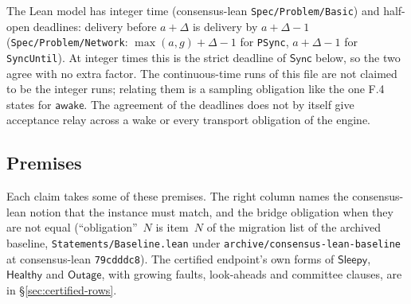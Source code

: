 \documentclass{article}
\begin{document}
The Lean model has integer time (consensus-lean \texttt{Spec/Problem/Basic})
and half-open deadlines: delivery before $a+\Delta$ is delivery by
$a+\Delta-1$ (\texttt{Spec/Problem/Network}: $\max(a,g)+\Delta-1$ for
\texttt{PSync}, $a+\Delta-1$ for \texttt{SyncUntil}).  At integer times this is
the strict deadline of $\mathsf{Sync}$ below, so the two agree with no extra
factor.  The continuous-time runs of this file are not claimed to be the
integer runs; relating them is a sampling obligation like the one F.4 states
for $\mathsf{awake}$.  The agreement of the deadlines does not by itself give
acceptance relay across a wake or every transport obligation of the engine.

\subsection{Premises}

\begin{sloppypar}
Each claim takes some of these premises.  The right column names the
consensus-lean notion that the instance must match, and the bridge obligation
when they are not equal (``obligation''~$N$ is item~$N$ of the migration
list of the archived baseline, \texttt{Statements/Baseline.lean} under
\texttt{archive/consensus-lean-baseline} at consensus-lean \texttt{79cdddc8}).
The certified endpoint's own forms of $\mathsf{Sleepy}$, $\mathsf{Healthy}$
and $\mathsf{Outage}$, with growing faults, look-aheads and committee
clauses, are in \S\ref{sec:certified-rows}.
\end{sloppypar}
\end{document}
